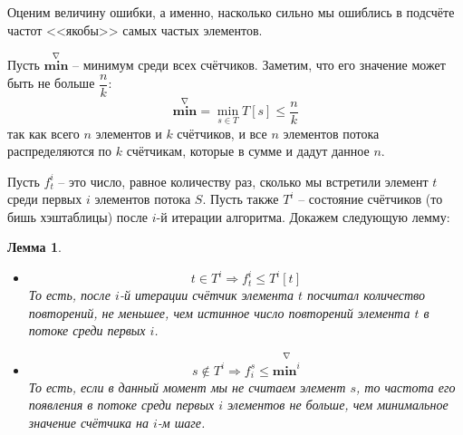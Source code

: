 \documentclass[a4paper,12pt]{article}
\newtheorem*{lemma}{Лемма}
\begin{document}
Оценим величину ошибки, а именно, насколько сильно мы ошиблись в подсчёте частот <<якобы>> самых частых элементов. 

Пусть $\overset{\nabla}{\textbf{min}}$ -- минимум среди всех счётчиков. Заметим, что его значение может быть не больше $\dfrac{n}{k}$:
\[\overset{\nabla}{\textbf{min}} = \min\limits_{s \in T} T[s] \leqslant \dfrac{n}{k}\] так как всего $n$ элементов и $k$ счётчиков, и все $n$ элементов потока распределяются по $k$ счётчикам, которые в сумме и дадут данное $n$.

Пусть $f_t^i$ -- это число, равное количеству раз, сколько мы встретили элемент $t$ среди первых $i$ элементов потока $S$. Пусть также $T^i$ -- состояние счётчиков (то бишь хэштаблицы) после $i$-й итерации алгоритма. Докажем следующую лемму:

\begin{lemma}
\ 

\begin{itemize}
    \item \[t \in T^i \Longrightarrow f_t^i \leqslant T^i[t] \] То есть, после $i$-й итерации счётчик элемента $t$ посчитал количество повторений, не меньшее, чем истинное число повторений элемента $t$ в потоке среди первых $i$.
    \item \[s \notin T^i \Longrightarrow f_i^s \leqslant \overset{\nabla}{\textbf{min}^i}\] То есть, если в данный момент мы не считаем элемент $s$, то частота его появления в потоке среди первых $i$ элементов не больше, чем минимальное значение счётчика на $i$-м шаге.
\end{itemize}
\end{lemma}
\end{document}
